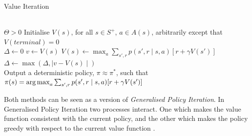 \begin{algorithm}[H]
\caption{Value Iteration \cite{sutton_reinforcement_1998}}
\label{alg:value-iteration}
\begin{algorithmic}
\\
\State $\Theta > 0$
\State Initialise $V(s)$, for all $s \in S^+$, $a \in A(s)$, arbitrarily except that $V(terminal) = 0$
\\
\Repeat
	\State $\Delta \gets 0$
		\State $v \gets V(s)$
		\State $V(s) \gets \max_a \sum_{s', r} p(s', r \mid s,a)[r + \gamma V(s')]$
\State $\Delta \gets \max(\Delta, \mid v - V(s)\mid)$
\EndFor
\Until{$\Delta < \Theta$}
\\
Output a deterministic policy, $\pi \approx \pi^*$, such that\\
$\pi(s) = \operatorname*{arg\,max}_a \sum_{s',r} p(s', r \mid s, a)[r + \gamma V(s')] $
\end{algorithmic}
\end{algorithm}
Both methods can be seen as a version of \textit{Generalised Policy Iteration}. In Generalised Policy Iteration two processes interact. One which makes the value function consistent with the current policy, and the other which makes the policy greedy with respect to the current value function \cite[p.~86]{sutton_reinforcement_1998}. 


 

 
 
